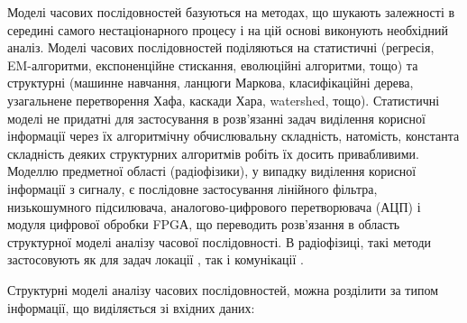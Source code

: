 Моделі часових послідовностей базуються на методах, що шукають залежності
в середині самого нестаціонарного процесу і на цій основі виконують 
необхідний аналіз. Моделі часових послідовностей поділяються на статистичні
(регресія, EM-алгоритми, експоненційне стискання, еволюційні алгоритми, тощо)
та структурні (машинне навчання, ланцюги Маркова, класифікаційні дерева, 
узагальнене перетворення Хафа, каскади Хара, watershed, тощо). Статистичні 
моделі не придатні для застосування в розв'язанні задач виділення корисної 
інформації через їх алгоритмічну обчислювальну складність, натомість, 
константа складність деяких структурних алгоритмів робіть їх досить 
привабливими. Моделлю предметної області (радіофізики), у випадку виділення 
корисної інформації з сигналу, є послідовне застосування лінійного фільтра, 
низькошумного підсилювача, аналогово-цифрового перетворювача (АЦП) і модуля 
цифрової обробки FPGА, що переводить розв'язання в область структурної моделі
аналізу часової послідовності. В радіофізиці, такі методи застосовують як 
для задач локації \cite{imp:Dumin2017}, так і комунікації \cite{imp:Taok2009}.

Структурні моделі аналізу часових послідовностей, можна розділити за типом
інформації, що виділяється зі вхідних даних:

